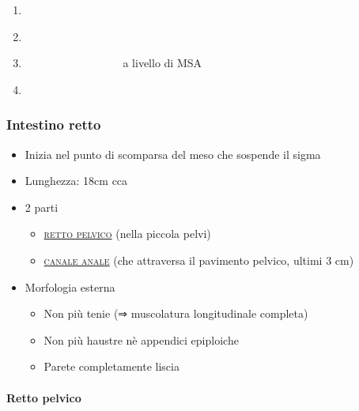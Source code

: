 \documentclass[italian,]{article}
\providecommand{\tightlist}{%
  \setlength{\itemsep}{0pt}\setlength{\parskip}{0pt}}
\newcommand{\lin}[1]{\colorbox{PineGreen}{\textcolor{white}{\textsc{#1}}}}
\renewcommand{\a}[1]{\underline{\textsc{#1}}}
\begin{document}
\begin{itemize}
  \begin{enumerate}
  \def\labelenumi{\arabic{enumi}.}
  \item
    \lin{linfonodi paracolici}
  \item
    \lin{linfonodi intermedi}
  \item
    \lin{linfonodi superiori} a livello di MSA
  \item
    \lin{cisterna del chilo}
  \end{enumerate}
\end{itemize}

\hypertarget{intestino-retto}{%
\subsubsection{Intestino retto}\label{intestino-retto}}

\begin{itemize}
\tightlist
\item
  Inizia nel punto di scomparsa del meso che sospende il sigma
\item
  Lunghezza: 18cm cca
\item
  2 parti

  \begin{itemize}
  \tightlist
  \item
    \a{retto pelvico} (nella piccola pelvi)
  \item
    \a{canale anale} (che attraversa il pavimento pelvico, ultimi 3 cm)
  \end{itemize}
\item
  Morfologia esterna

  \begin{itemize}
  \tightlist
  \item
    Non più tenie (⇒ muscolatura longitudinale completa)
  \item
    Non più haustre nè appendici epiploiche
  \item
    Parete completamente liscia
  \end{itemize}
\end{itemize}

\hypertarget{retto-pelvico}{%
\paragraph{Retto pelvico}\label{retto-pelvico}}
\end{document}
